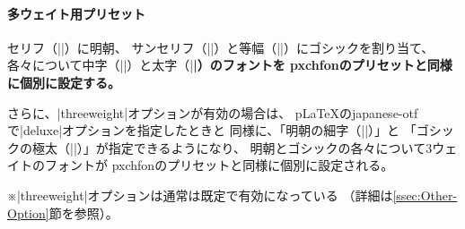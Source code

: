 \documentclass[xelatex,ja=standard,jafont=ipaex,
  a4paper]{bxjsarticle}
\newcommand{\Pkg}[1]{\textsf{#1}}
\newcommand{\Note}{\par\noindent ※}
\begin{document}
\paragraph{多ウェイト用プリセット}
セリフ（|\rmfamily|）に明朝、
サンセリフ（|\sffamily|）と等幅（|\ttfamily|）にゴシックを割り当て、
各々について中字（|\mdseries|）と太字（|\bfseries|）のフォントを
\Pkg{pxchfon}のプリセットと同様に個別に設定する。

さらに、|threeweight|\>オプションが有効の場合は、
{p\LaTeX}\>の\Pkg{japanese-otf}で\>|deluxe|\>オプションを指定したときと
同様に、「明朝の細字（|\rmfamily\ltseries|）」と
「ゴシックの極太（|\sffamily\ebseries|）」が指定できるようになり、
明朝とゴシックの各々について3ウェイトのフォントが
\Pkg{pxchfon}のプリセットと同様に個別に設定される。
\Note |threeweight|\>オプションは通常は既定で有効になっている
（詳細は\>\ref{ssec:Other-Option}\>節を参照）。
\end{document}
